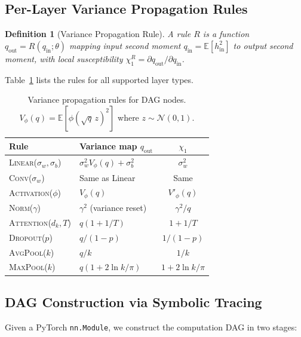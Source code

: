 \documentclass[10pt]{article}
\newcommand{\EE}{\mathbb{E}}
\newtheorem{definition}[theorem]{Definition}
\begin{document}
\subsection{Per-Layer Variance Propagation Rules}

\begin{definition}[Variance Propagation Rule]
\label{def:var-rule}
A rule $R$ is a function $q_{\mathrm{out}} = R(q_{\mathrm{in}}; \theta)$ mapping input second moment $q_{\mathrm{in}} = \EE[h_{\mathrm{in}}^2]$ to output second moment, with local susceptibility $\chi_1^R = \partial q_{\mathrm{out}}/\partial q_{\mathrm{in}}$.
\end{definition}

Table~\ref{tab:rules} lists the rules for all supported layer types.

\begin{table}[t]
\centering
\caption{Variance propagation rules for DAG nodes. $V_\phi(q) = \EE[\phi(\sqrt{q}\,z)^2]$ where $z \sim \mathcal{N}(0,1)$.}
\label{tab:rules}
\small
\begin{tabular}{@{}llc@{}}
\toprule
\textbf{Rule} & \textbf{Variance map $q_{\mathrm{out}}$} & $\chi_1$ \\
\midrule
\textsc{Linear}($\sigma_w, \sigma_b$) & $\sigma_w^2 V_\phi(q) + \sigma_b^2$ & $\sigma_w^2$ \\
\textsc{Conv}($\sigma_w$) & Same as Linear & Same \\
\textsc{Activation}($\phi$) & $V_\phi(q)$ & $V'_\phi(q)$ \\
\textsc{Norm}($\gamma$) & $\gamma^2$ (variance reset) & $\gamma^2/q$ \\
\textsc{Attention}($d_k, T$) & $q(1 + 1/T)$ & $1 + 1/T$ \\
\textsc{Dropout}($p$) & $q/(1\!-\!p)$ & $1/(1\!-\!p)$ \\
\textsc{AvgPool}($k$) & $q/k$ & $1/k$ \\
\textsc{MaxPool}($k$) & $q(1 + 2\ln k/\pi)$ & $1+2\ln k/\pi$ \\
\bottomrule
\end{tabular}
\end{table}

\subsection{DAG Construction via Symbolic Tracing}

Given a PyTorch \texttt{nn.Module}, we construct the computation DAG in two stages:
\end{document}
